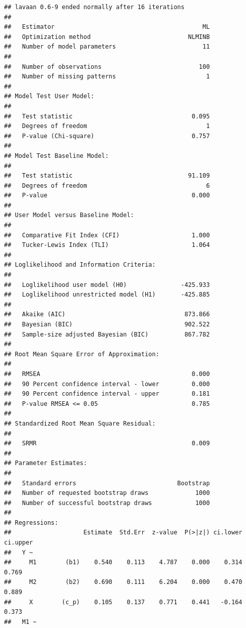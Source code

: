 \documentclass[
  11pt,
]{book}
\begin{document}
\begin{verbatim}
## lavaan 0.6-9 ended normally after 16 iterations
## 
##   Estimator                                         ML
##   Optimization method                           NLMINB
##   Number of model parameters                        11
##                                                       
##   Number of observations                           100
##   Number of missing patterns                         1
##                                                       
## Model Test User Model:
##                                                       
##   Test statistic                                 0.095
##   Degrees of freedom                                 1
##   P-value (Chi-square)                           0.757
## 
## Model Test Baseline Model:
## 
##   Test statistic                                91.109
##   Degrees of freedom                                 6
##   P-value                                        0.000
## 
## User Model versus Baseline Model:
## 
##   Comparative Fit Index (CFI)                    1.000
##   Tucker-Lewis Index (TLI)                       1.064
## 
## Loglikelihood and Information Criteria:
## 
##   Loglikelihood user model (H0)               -425.933
##   Loglikelihood unrestricted model (H1)       -425.885
##                                                       
##   Akaike (AIC)                                 873.866
##   Bayesian (BIC)                               902.522
##   Sample-size adjusted Bayesian (BIC)          867.782
## 
## Root Mean Square Error of Approximation:
## 
##   RMSEA                                          0.000
##   90 Percent confidence interval - lower         0.000
##   90 Percent confidence interval - upper         0.181
##   P-value RMSEA <= 0.05                          0.785
## 
## Standardized Root Mean Square Residual:
## 
##   SRMR                                           0.009
## 
## Parameter Estimates:
## 
##   Standard errors                            Bootstrap
##   Number of requested bootstrap draws             1000
##   Number of successful bootstrap draws            1000
## 
## Regressions:
##                    Estimate  Std.Err  z-value  P(>|z|) ci.lower ci.upper
##   Y ~                                                                   
##     M1        (b1)    0.540    0.113    4.787    0.000    0.314    0.769
##     M2        (b2)    0.690    0.111    6.204    0.000    0.470    0.889
##     X        (c_p)    0.105    0.137    0.771    0.441   -0.164    0.373
##   M1 ~                                                                  

\end{verbatim}
\end{document}
